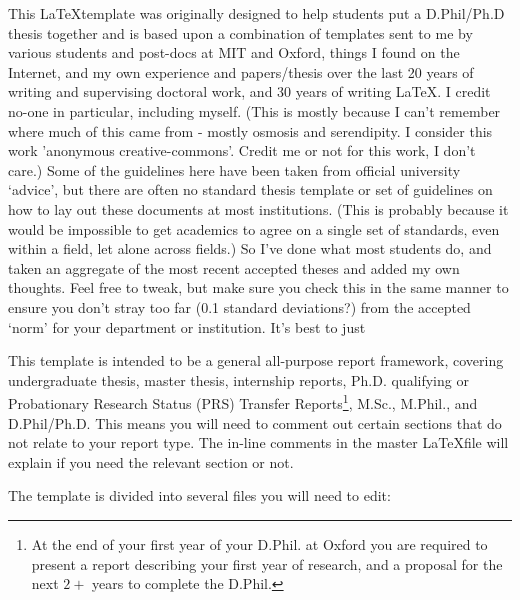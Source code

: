 This \LaTeX template was originally designed to help students put a D.Phil/Ph.D thesis together and is based upon a combination of templates sent to me by various students and post-docs at MIT and Oxford, things I found on the Internet, and my own experience and papers/thesis over the last 20 years of writing and supervising doctoral work, and 30 years of writing \LaTeX. I credit no-one in particular, including myself. (This is mostly because I can't remember where much of this came from - mostly osmosis and serendipity. I consider this work 'anonymous creative-commons'. Credit me or not for this work, I don't care.)
Some of the guidelines here have been taken from official university `advice', but there are often no standard thesis template or set of guidelines on how to lay out these documents at most institutions. (This is probably because it would be impossible to get academics to agree on a single set of standards, even within a field, let alone across fields.) So I've done what most students do, and taken an aggregate of the most recent accepted theses and added my own thoughts. Feel free to tweak, but make sure you check this in the same manner to ensure you don't stray too far (0.1 standard deviations?) from the accepted `norm' for your department or institution. It's best to just 



This template is intended to be a general all-purpose report framework, covering undergraduate thesis, master thesis, internship reports, Ph.D. qualifying or Probationary Research Status (PRS) Transfer Reports\footnote{At the end of your first year of your D.Phil. at Oxford you are required to present a report describing your first year of 
research, and a proposal for the next $2+$ years to complete the D.Phil.}, M.Sc., M.Phil., and D.Phil/Ph.D. This means you will need to comment out certain sections that do not relate to  your report type. The in-line comments in the master \LaTeX  file will explain if you need the relevant section or not.

The template is divided into several files you will need to edit:

